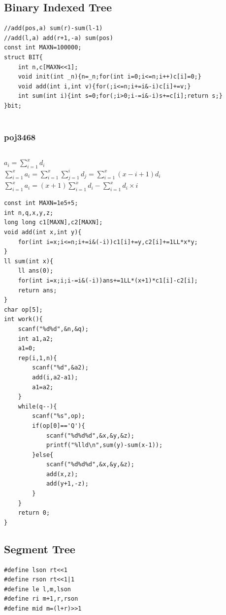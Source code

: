 \documentclass[twoside]{article}
\begin{document}
\subsection{Binary Indexed Tree}
\begin{lstlisting}
//add(pos,a) sum(r)-sum(l-1)
//add(l,a) add(r+1,-a) sum(pos)
const int MAXN=100000;
struct BIT{
    int n,c[MAXN<<1];
    void init(int _n){n=_n;for(int i=0;i<=n;i++)c[i]=0;}
    void add(int i,int v){for(;i<=n;i+=i&-i)c[i]+=v;}
    int sum(int i){int s=0;for(;i>0;i-=i&-i)s+=c[i];return s;}
}bit;


\end{lstlisting}
\subsubsection{poj3468}
\begin{lstlisting}
\end{lstlisting}
$a_{i}=\sum_{i=1}^{x}d_{i}$ \\
$\sum_{i=1}^{x}a_{i}=\sum_{i=1}^{x}\sum_{j=1}^{i}d_{j}=\sum_{i=1}^{x}(x-i+1)d_{i}$ \\
$\sum_{i=1}^{x}a_{i}=(x+1)\sum_{i=1}^{x}d_{i}-\sum_{i=1}^{x}d_{i}\times i$ \\
\begin{lstlisting}
const int MAXN=1e5+5;
int n,q,x,y,z;
long long c1[MAXN],c2[MAXN];
void add(int x,int y){
    for(int i=x;i<=n;i+=i&(-i))c1[i]+=y,c2[i]+=1LL*x*y;
}
ll sum(int x){
    ll ans(0);
    for(int i=x;i;i-=i&(-i))ans+=1LL*(x+1)*c1[i]-c2[i];
    return ans;
}
char op[5];
int work(){
    scanf("%d%d",&n,&q);
    int a1,a2;
    a1=0;
    rep(i,1,n){
        scanf("%d",&a2);
        add(i,a2-a1);
        a1=a2;
    }
    while(q--){
        scanf("%s",op);
        if(op[0]=='Q'){
            scanf("%d%d%d",&x,&y,&z);
            printf("%lld\n",sum(y)-sum(x-1));
        }else{
            scanf("%d%d%d",&x,&y,&z);
            add(x,z);
            add(y+1,-z);
        }
    }
    return 0;
}
\end{lstlisting}
\subsection{Segment Tree}
\begin{lstlisting}
#define lson rt<<1      
#define rson rt<<1|1    
#define le l,m,lson     
#define ri m+1,r,rson
#define mid m=(l+r)>>1
\end{lstlisting}
\end{document}
